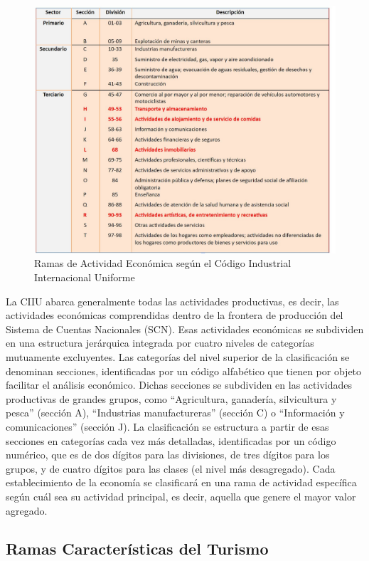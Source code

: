 \documentclass[
  openany]{book}
\begin{document}
\begin{figure}

{\centering \includegraphics[width=0.8\linewidth]{imagenes/figura1.1} 

}

\caption{Ramas de Actividad Económica según el Código Industrial Internacional Uniforme}\label{fig:ciiu}
\end{figure}

La CIIU abarca generalmente todas las actividades productivas, es decir, las actividades económicas comprendidas dentro de la frontera de producción del Sistema de Cuentas Nacionales (SCN). Esas actividades económicas se subdividen en una estructura jerárquica integrada por cuatro niveles de categorías mutuamente excluyentes. Las categorías del nivel superior de la clasificación se denominan secciones, identificadas por un código alfabético que tienen por objeto facilitar el análisis económico. Dichas secciones se subdividen en las actividades productivas de grandes grupos, como ``Agricultura, ganadería, silvicultura y pesca'' (sección A), ``Industrias manufactureras'' (sección C) o ``Información y comunicaciones'' (sección J). La clasificación se estructura a partir de esas secciones en categorías cada vez más detalladas, identificadas por un código numérico, que es de dos dígitos para las divisiones, de tres dígitos para los grupos, y de cuatro dígitos para las clases (el nivel más desagregado). Cada establecimiento de la economía se clasificará en una rama de actividad específica según cuál sea su actividad principal, es decir, aquella que genere el mayor valor agregado.

\hypertarget{ramas-caracteruxedsticas-del-turismo}{%
\subsection{Ramas Características del Turismo}\label{ramas-caracteruxedsticas-del-turismo}}
\end{document}
